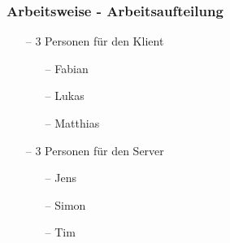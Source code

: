\documentclass[aspectratio=1610]{beamer}
\begin{document}
  \begin{frame}[plain]
      \frametitle{\textbf{Arbeitsweise - Arbeitsaufteilung}}
      \begin{itemize}
          \setlength\itemsep{0.3em}
          \item[--] 3 Personen für den Klient
              \begin{itemize}
                  \item[--] Fabian
                  \item[--] Lukas
                  \item[--] Matthias
              \end{itemize}
          \item[--] 3 Personen für den Server
              \begin{itemize}
                  \item[--] Jens
                  \item[--] Simon
                  \item[--] Tim
              \end{itemize}
      \end{itemize}
  \end{frame}
\end{document}
